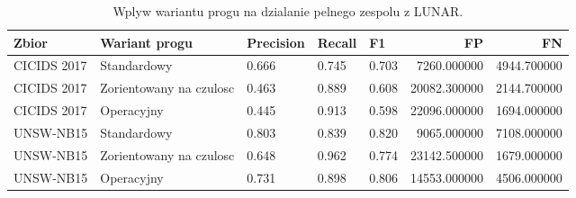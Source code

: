 \begin{table}
\caption{Wplyw wariantu progu na dzialanie pelnego zespolu z LUNAR.}
\label{tab:ensemble_lunar_thresholds}
\begin{tabular}{lllllrr}
\toprule
Zbior & Wariant progu & Precision & Recall & F1 & FP & FN \\
\midrule
CICIDS 2017 & Standardowy & 0.666 & 0.745 & 0.703 & 7260.000000 & 4944.700000 \\
CICIDS 2017 & Zorientowany na czulosc & 0.463 & 0.889 & 0.608 & 20082.300000 & 2144.700000 \\
CICIDS 2017 & Operacyjny & 0.445 & 0.913 & 0.598 & 22096.000000 & 1694.000000 \\
UNSW-NB15 & Standardowy & 0.803 & 0.839 & 0.820 & 9065.000000 & 7108.000000 \\
UNSW-NB15 & Zorientowany na czulosc & 0.648 & 0.962 & 0.774 & 23142.500000 & 1679.000000 \\
UNSW-NB15 & Operacyjny & 0.731 & 0.898 & 0.806 & 14553.000000 & 4506.000000 \\
\bottomrule
\end{tabular}
\end{table}
